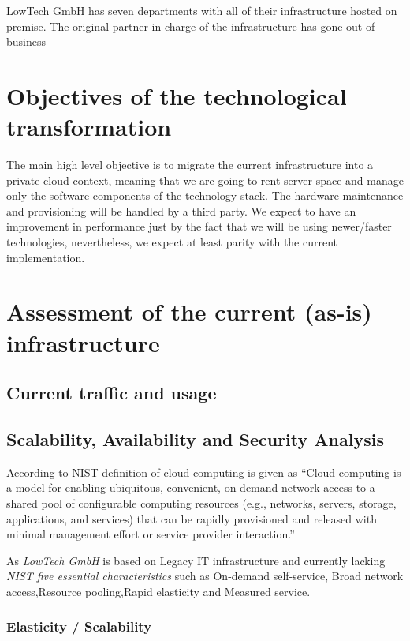 \documentclass{llncs}
\begin{document}
LowTech GmbH has seven departments with all of their infrastructure hosted on premise. The original partner in charge of the infrastructure has gone out of business


\section{Objectives of the technological transformation}

The main high level objective is to migrate the current infrastructure into a private-cloud context, meaning that we are going to rent server space and manage only the software components of the technology stack. The hardware maintenance and provisioning will be handled by a third party. We expect to have an improvement in performance just by the fact that we will be using newer/faster technologies, nevertheless, we expect at least parity with the current implementation. 


\section{Assessment of the current (as-is) infrastructure}

\subsection{Current traffic and usage}

\subsection{Scalability, Availability and Security Analysis}
According to NIST definition of cloud computing is given as ``Cloud computing is a model for enabling ubiquitous, convenient, on-demand network access to a shared
pool of configurable computing resources (e.g., networks, servers, storage, applications, and services) that
can be rapidly provisioned and released with minimal management effort or service provider interaction.'' \cite{mell2011nist}

As \textit{LowTech GmbH} is based on Legacy IT infrastructure and currently lacking \textit{NIST five
essential characteristics} such as On-demand self-service, Broad network access,Resource pooling,Rapid elasticity and Measured service.

\subsubsection*{Elasticity / Scalability}
\end{document}
